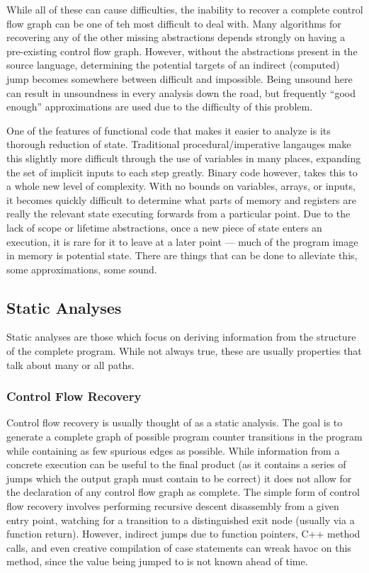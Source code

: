 While all of these can cause difficulties, the inability to recover a complete control flow graph can be one of teh most difficult to deal with.
Many algorithms for recovering any of the other missing abstractions depends strongly on having a pre-existing control flow graph\cite{vsa,bddbddb,maymust,tie,bitr,wrappedintervals,Ramalingam2002b}.
However, without the abstractions present in the source language, determining the potential targets of an indirect (computed) jump becomes somewhere between difficult and impossible.
Being unsound here can result in unsoundness in every analysis down the road, but frequently ``good enough'' approximations are used due to the difficulty of this problem.

One of the features of functional code that makes it easier to analyze is its thorough reduction of state.
Traditional procedural/imperative langauges make this slightly more difficult through the use of variables in many places, expanding the set of implicit inputs to each step greatly.
Binary code however, takes this to a whole new level of complexity.
With no bounds on variables, arrays, or inputs, it becomes quickly difficult to determine what parts of memory and registers are really the relevant state executing forwards from a particular point.
Due to the lack of scope or lifetime abstractions, once a new piece of state enters an execution, it is rare for it to leave at a later point --- much of the program image in memory is potential state.
There are things that can be done to alleviate this, some approximations, some sound.

\subsection{Static Analyses}
Static analyses are those which focus on deriving information from the structure of the complete program.
While not always true, these are usually properties that talk about many or all paths.

\subsubsection{Control Flow Recovery}
\label{sec:cfg}
Control flow recovery is usually thought of as a static analysis.
The goal is to generate a complete graph of possible program counter transitions in the program while containing as few spurious edges as possible.
While information from a concrete execution can be useful to the final product (as it contains a series of jumps which the output graph must contain to be correct) it does not allow for the declaration of any control flow graph as complete.
The simple form of control flow recovery involves performing recursive descent disassembly from a given entry point, watching for a transition to a distinguished exit node (usually via a function return).
However, indirect jumps due to function pointers, C++ method calls, and even creative compilation of case statements can wreak havoc on this method, since the value being jumped to is not known ahead of time.


